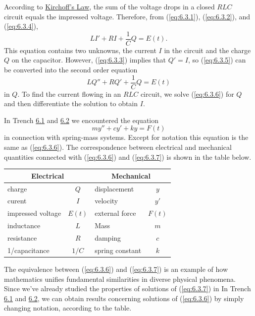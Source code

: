 \documentclass{ximera}
\begin{document}
According to
\href{http://www-history.mcs.st-and.ac.uk/Mathematicians/Kirchhoff.html}
{Kirchoff's Law}, the sum of
the voltage drops in a closed $RLC$ circuit equals the impressed
voltage. Therefore, from (\ref{eq:6.3.1}), (\ref{eq:6.3.2}), and (\ref{eq:6.3.4}),
\begin{equation} \label{eq:6.3.5}
 LI'+RI+\frac{1}{C}Q=E(t).
\end{equation}
This equation contains two unknowns, the current $I$ in the
circuit and the charge $Q$ on the capacitor. However, (\ref{eq:6.3.3})
implies that $Q'=I$, so (\ref{eq:6.3.5}) can be converted into the second
order equation
\begin{equation} \label{eq:6.3.6}
 LQ''+RQ'+\frac{1}{C}Q=E(t)
\end{equation}
in $Q$. To find the current flowing in an $RLC$ circuit, we solve
(\ref{eq:6.3.6}) for $Q$ and then differentiate the solution to obtain
$I$.

In Trench \href{https://ximera.osu.edu/ode/main/springProblemsI/springProblemsI}{6.1} and \href{https://ximera.osu.edu/ode/main/springProblemsII/springProblemsII}{6.2} we encountered the
equation
\begin{equation} \label{eq:6.3.7}
my''+cy'+ky=F(t)
\end{equation}
in connection with spring-mass systems. Except for notation this
equation is the same as (\ref{eq:6.3.6}). The correspondence between
electrical and mechanical quantities connected with (\ref{eq:6.3.6}) and
(\ref{eq:6.3.7}) is shown in the table below.

\begin{center}
\begin{tabular}{|lc|lc|}\hline
\multicolumn{2}{|c|}{\bf Electrical}&
\multicolumn{2}{c|}{\bf Mechanical}\\\hline
charge& $Q$& displacement&$y$\\\hline
curent&$I$&velocity&$y'$\\\hline
impressed voltage&$E(t)$&external force&$F(t)$\\\hline
inductance&$L$&Mass&$m$\\\hline
resistance&$R$&damping&$c$\\\hline
1/capacitance&$1/C$&spring constant&$k$\\\hline
\end{tabular}
\end{center}

The equivalence between (\ref{eq:6.3.6}) and (\ref{eq:6.3.7}) is an example of
how mathematics unifies fundamental similarities in diverse physical
phenomena. Since we've already studied the properties of solutions of
(\ref{eq:6.3.7}) in In Trench \href{https://ximera.osu.edu/ode/main/springProblemsI/springProblemsI}{6.1} and \href{https://ximera.osu.edu/ode/main/springProblemsII/springProblemsII}{6.2}, we
can obtain
results concerning solutions of (\ref{eq:6.3.6}) by simply changing
notation, according to the table.
\end{document}
